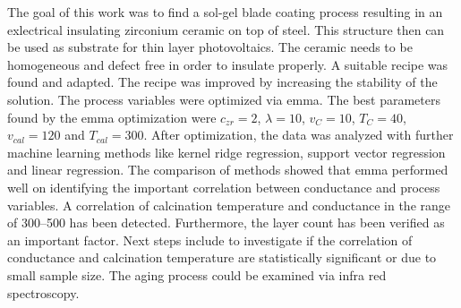 The goal of this work was to find a sol-gel blade coating process resulting in an exlectrical insulating zirconium ceramic on top of steel.
This structure then can be used as substrate for thin layer photovoltaics. 
The ceramic needs to be homogeneous and defect free in order to insulate properly.
A suitable recipe was found\cite{Hu2016} and adapted. 
The recipe was improved by increasing the stability of the solution. 
The process variables were optimized via \gls{emma}. 
The best parameters found by the \gls{emma} optimization were 
$c_{zr}=2$, $\lambda=10$, $v_{C}=10$, $T_{C}=40$, $v_{cal}=120$ and $T_{cal}=300$.
After optimization, the data was analyzed with further machine learning methods like kernel ridge regression, support vector regression and linear regression. 
The comparison of methods showed that \gls{emma} performed well on identifying the important correlation between conductance and process variables. 
A correlation of calcination temperature and conductance in the range of 300--500\oc{} has been detected.
Furthermore, the layer count has been verified as an important factor. 
Next steps include to investigate if the correlation of conductance and calcination temperature are statistically significant or due to small sample size. 
The aging process could be examined via infra red spectroscopy. 
\iffalse
was kann noch veraendert werden? 
humidity 
solution age
vdb and tdb on g and phd 
Tcal on g and phd 

Making of the solution for the sol-gel process:
For a single concentrated solution \ml{0.05} of \gls{zrpro} are added while stirring to \ml{4.95} of \gls{buoh} and stirred for \minutes{15}. 
\ml{0.013} (or one molar equvilent of Zr) of \gls{acac} is added to the stirring solution. 
After another \minutes{15} \ml{1} of acetic acid is added and stirred for \minutes{30} to stabilize the solution up to \h{24}. 

The concentration can be increased up to 5 times being stable for a minimum of \h{4}. 
The sol-gel process produces am homogeneous transparent crystalline zirconia oxide layer. 
homogeneity can be mainly controlled via blade velocity and temperature and layers can be stacked.

It should have been also verglichen with grid search with comparable size
but most time was used to find a vernuenfig base recipe and process

It is still very human 
Der process is - as it the case with all ML and most fitting processes - is very abhaengig von hyper parameters, 
In the current work population size, number of generations, and most importantly boundaries (grenzen). 
\fi

